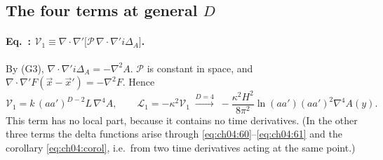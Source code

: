 \subsection{The four terms at general \texorpdfstring{$D$}{D} \texorpdfstring{\tD}{}}

\paragraph{Eq.~: $\mathcal V_1\equiv\nabla\!\cdot\!\nabla'\big[\mathcal P\,\nabla\!\cdot\!\nabla' i\Delta_A\big]$.}
By (G3), $\nabla\!\cdot\!\nabla' i\Delta_A=-\nabla^2A$.
$\mathcal P$ is constant in space, and $\nabla\!\cdot\!\nabla'F(\vec x-\vec x')=-\nabla^2F$. Hence
\begin{equation*}
\mathcal V_1=k\,(aa')^{D-2}L\,\nabla^4A,\qquad
\mathcal L_1=-\kappa^2\mathcal V_1\;\xrightarrow{D=4}\;-\frac{\kappa^2H^2}{8\pi^2}\ln(aa')(aa')^2\nabla^4A(y).
\tag{I.63$'$}\label{eq:ch04:63}
\end{equation*}
This term has no local part, because it contains no time derivatives.
(In the other three terms the delta functions arise through \eqref{eq:ch04:60}--\eqref{eq:ch04:61} and the corollary \eqref{eq:ch04:corol}, i.e.\ from two time derivatives acting at the same point.)

